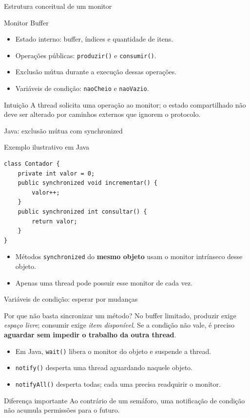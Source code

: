 \documentclass[aspectratio=169,11pt]{beamer}
\begin{document}
\begin{frame}{Estrutura conceitual de um monitor}
\small
\begin{block}{Monitor Buffer}
\begin{itemize}
\item Estado interno: buffer, índices e quantidade de itens.
\item Operações públicas: \texttt{produzir()} e \texttt{consumir()}.
\item Exclusão mútua durante a execução dessas operações.
\item Variáveis de condição: \texttt{naoCheio} e \texttt{naoVazio}.
\end{itemize}
\end{block}
\begin{exampleblock}{Intuição}
A thread solicita uma operação ao monitor; o estado compartilhado não deve ser alterado por caminhos externos que ignorem o protocolo.
\end{exampleblock}
\end{frame}

\begin{frame}[fragile]{Java: exclusão mútua com synchronized}
\small
\begin{block}{Exemplo ilustrativo em Java}
\begin{verbatim}
class Contador {
    private int valor = 0;
    public synchronized void incrementar() {
        valor++;
    }
    public synchronized int consultar() {
        return valor;
    }
}
\end{verbatim}
\end{block}
\begin{itemize}
\item Métodos \texttt{synchronized} do \textbf{mesmo objeto} usam o monitor intrínseco desse objeto.
\item Apenas uma thread pode possuir esse monitor de cada vez.
\end{itemize}
\end{frame}

\begin{frame}{Variáveis de condição: esperar por mudanças}
\small
\begin{block}{Por que não basta sincronizar um método?}
No buffer limitado, produzir exige \emph{espaço livre}; consumir exige \emph{item disponível}. Se a condição não vale, é preciso \textbf{aguardar sem impedir o trabalho da outra thread}.
\end{block}
\begin{itemize}
\item Em Java, \texttt{wait()} libera o monitor do objeto e suspende a thread.
\item \texttt{notify()} desperta uma thread aguardando naquele objeto.
\item \texttt{notifyAll()} desperta todas; cada uma precisa readquirir o monitor.
\end{itemize}
\begin{alertblock}{Diferença importante}
Ao contrário de um semáforo, uma notificação de condição não acumula permissões para o futuro.
\end{alertblock}
\end{frame}
\end{document}
